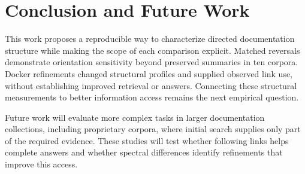 \section{Conclusion and Future Work}
This work proposes a reproducible way to characterize directed documentation
structure while making the scope of each comparison explicit. Matched reversals
demonstrate orientation sensitivity beyond preserved summaries in ten corpora.
Docker refinements changed structural profiles and supplied observed link use,
without establishing improved retrieval or answers. Connecting these structural
measurements to better information access remains the next empirical question.

Future work will evaluate more complex tasks in larger documentation
collections, including proprietary corpora, where initial search supplies only
part of the required evidence. These studies will test whether following links
helps complete answers and whether spectral differences identify refinements
that improve this access.

